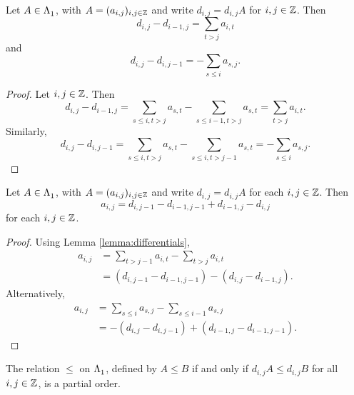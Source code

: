 \documentclass[a4paper, 11pt]{report}
\begin{document}
\begin{lemma}\label{lemma:differentials}
Let $A\in\Lambda_1^{}$, with $A=(a_{i,j})_{i,j\in\mathbb{Z}}$ and write $d_{i,j} = d_{i,j}A$ for $i,j\in\mathbb{Z}$. Then
\begin{equation*}
d_{i,j} - d_{i-1,j} = \sum_{t>j}a_{i,t}
\end{equation*}
and
\begin{equation*}
d_{i,j}-d_{i,j-1} = - \sum_{s\le i}a_{s,j}.
\end{equation*}
\end{lemma}

\begin{proof}
Let $i,j\in\mathbb{Z}$. Then
\begin{equation*}
d_{i,j} - d_{i-1,j} = \sum_{s\le i,t>j}a_{s,t} - \sum_{s\le i-1,t>j}a_{s,t} = \sum_{t>j}a_{i,t}.
\end{equation*}
Similarly,
\begin{equation*}
d_{i,j}-d_{i,j-1} = \sum_{s\le i,t>j}a_{s,t} - \sum_{s\le i,t>j-1}a_{s,t} = -\sum_{s\le i}a_{s,j}.
\end{equation*}
\end{proof}

\begin{lemma}\label{lemma:antisymmetry}
Let $A\in\Lambda_1^{}$, with $A = (a_{i,j})_{i,j\in\mathbb{Z}}$ and write $d_{i,j}=d_{i,j}A$ for each $i,j\in\mathbb{Z}$. Then
\begin{equation*}
a_{i,j} = d_{i,j-1} - d_{i-1,j-1} + d_{i-1,j} - d_{i,j}
\end{equation*}
for each $i,j\in\mathbb{Z}$.
\end{lemma}
\begin{proof}
Using Lemma \ref{lemma:differentials},
\begin{align*}
a_{i,j}
&= \sum_{t>j-1}a_{i,t} - \sum_{t>j}a_{i,t}\\
&= (d_{i,j-1} - d_{i-1,j-1}) - (d_{i,j} - d_{i-1,j}).
\end{align*}
Alternatively,
\begin{align*}
a_{i,j}
&= \sum_{s\le i}a_{s,j} - \sum_{s\le i-1}a_{s,j}\\
&= -(d_{i,j}-d_{i,j-1}) + (d_{i-1,j} - d_{i-1,j-1}).
\end{align*}
\end{proof}

\begin{lemma}\label{lemma:orbit-poset}
The relation $\le$ on $\Lambda_1^{}$, defined by $A\le B$ if and only if $d_{i,j}A\le d_{i,j}B$ for all $i,j\in\mathbb{Z}$, is a partial order.
\end{lemma}
\end{document}
